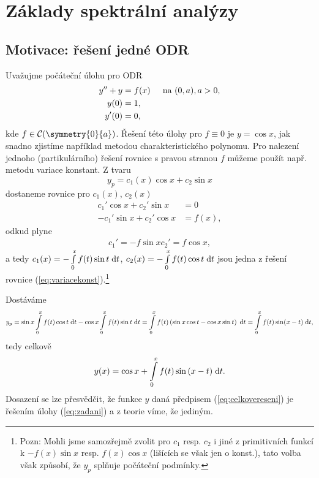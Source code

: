 \section{Základy spektrální analýzy}

\subsection{Motivace: řešení jedné ODR}
\Priklad 

Uvažujme počáteční úlohu pro ODR
\begin{equation}
    \begin{split}
        y''+y&=f(x) \text{\;\;\;\; na } (0,a), a>0,\\
        y(0)&=1,\\
        y'(0)&=0,
    \end{split}
    \label{eq:zadani}
\end{equation}
kde $f\in \mathcal{C}(\symmetry{0}{a})$. Řešení této úlohy pro $f\equiv 0$ je $y=\cos x$, jak snadno zjistíme například metodou charakteristického polynomu. Pro nalezení jednoho (partikulárního) řešení rovnice s pravou stranou $f$ můžeme použít např. metodu variace konstant. Z tvaru
\begin{equation}
    y_p=c_1(x) \cos x+c_2 \sin x
\end{equation}
dostaneme rovnice pro $c_1(x)$, $c_2(x)$
\begin{equation}
    \begin{split}
        c_1'\cos x+c_2'\sin x&=0\\
        -c_1'\sin x+c_2'\cos x&=f(x),
    \end{split}
    \label{eq:variacekonst}
\end{equation}
odkud plyne
\begin{equation}
    \begin{split}
        c_1'=-f \sin x
        c_2'=f\cos x,
    \end{split}
\end{equation}
a tedy $ c_1(x) = -\int\limits_0^xf(t)\sin t \;\mathrm{d}t$, $ c_2(x) = -\int\limits_0^xf(t)\cos t \;\mathrm{d}t$ jsou jedna z řešení rovnice (\ref{eq:variacekonst}).\footnote{Pozn: Mohli jsme samozřejmě zvolit pro $c_1$ resp. $c_2$ i jiné z primitivních funkcí k $-f(x)\sin x$ resp. $f(x) \cos x$ (lišících se však jen o konst.), tato volba však způsobí, že $y_p$ splňuje počáteční podmínky.}

Dostáváme
\begin{equation}
        y_p=\sin x \int\limits_0^xf(t)\cos t\;\mathrm{d}t-\cos x\int\limits_0^x f(t)\sin t\;\mathrm{d}t=\int\limits_0^x f(t)\left(\sin x \cos t-\cos x\sin t\right) \;\mathrm{d}t= \int\limits_0^xf(t) \sin(x-t)\;\mathrm{d}t,
\end{equation}
tedy celkově
\begin{equation}
    y(x)=\cos x+\int\limits_0^x f(t)\sin{(x-t)}\;\mathrm{d}t.
    \label{eq:celkovereseni}
\end{equation}
Dosazení se lze přesvědčit, že funkce $y$ daná předpisem (\ref{eq:celkovereseni}) je řešením úlohy (\ref{eq:zadani}) a z teorie víme, že jediným.

